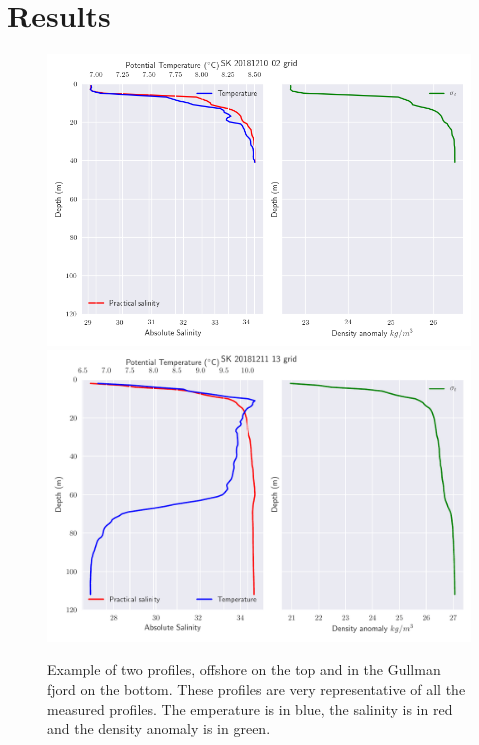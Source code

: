 \documentclass[12pt,a4paper]{article}
\begin{document}
\section{Results}

\begin{figure}
  \centering
  \includegraphics[width=\textwidth]{prof_offshore}
  \includegraphics[width=\textwidth]{prof_fjord}
  \caption{\label{fig:profex}Example of two profiles, offshore on the top and in
    the Gullman fjord on the bottom.
    These profiles are very representative of all the measured profiles.
    The emperature is in blue, the salinity is in red and the density anomaly
  is in green.}
\end{figure}
\end{document}
